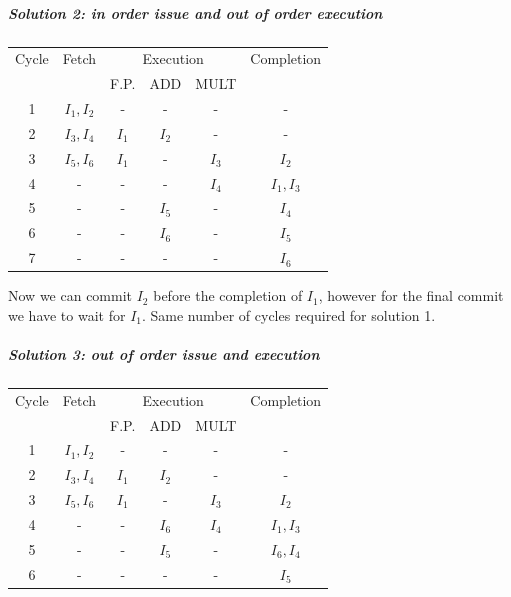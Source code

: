 \subparagraph{Solution 2: in order issue and out of order execution}

\begin{center}
  \begin{tabular}{|c|c|c|c|c|c|}
    \hline
    Cycle&    Fetch       &\multicolumn{3}{|c|}{Execution}  &   Completion  \\
    &       &     F.P.  & ADD     & MULT  &               \\ \hline \hline
    1&    $I_1, I_2$&       -&    -&    -&      -\\
    2&    $I_3, I_4$&       $I_1$&  $I_2$&  -&      -\\
    3&    $I_5, I_6$&       $I_1$&  -&    $I_3$&      $I_2$\\
    4&      -&          -&    -&    $I_4$&      $I_1,I_3$\\
    5&      -&          -&    $I_5$&    -&      $I_4$\\
    6&      -&          -&    $I_6$&    -&      $I_5$\\
    7&      -&          -&    -&      -&      $I_6$\\
    \hline
  \end{tabular}
\end{center}


Now we can commit $I_2$ before the completion of $I_1$, however for the final commit we have to wait for $I_1$. Same number of cycles required for solution 1.

\subparagraph{Solution 3: out of order issue and execution}

\begin{center}
\begin{tabular}{|c|c|c|c|c|c|}
  \hline
  Cycle&    Fetch       &\multicolumn{3}{|c|}{Execution}  &   Completion  \\
  &       &     F.P.  & ADD     & MULT  &               \\ \hline \hline
  1&    $I_1, I_2$&    -    & -   & - &         -     \\
  2&    $I_3,I_4$&        $I_1$&  $I_2$&  -&            -     \\
  3&    $I_5,I_6$&        $I_1$&  -&    $I_3$&          $I_2$   \\
  4&      -&          -&    $I_6$&  $I_4$&          $I_1, I_3$  \\
  5&      -&          -&    $I_5$&  -&            $I_6, I_4$  \\
  6&      -&          -&    -&    -&            $I_5$   \\
  \hline
\end{tabular}
\end{center}

